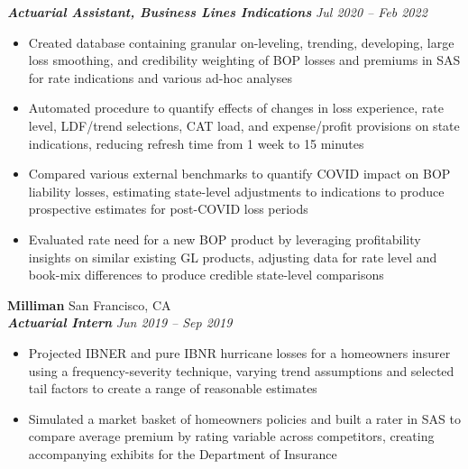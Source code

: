 \documentclass[11pt,letterpaper]{article}
\newcommand{\smallspace}{\vspace{6pt}}
\begin{document}
\textbf{\textit{Actuarial Assistant, Business Lines Indications}} \hfill \textit{Jul 2020 -- Feb 2022}
\begin{itemize}
	\item Created database containing granular on-leveling, trending, developing, large loss smoothing, and credibility weighting of BOP losses and premiums in SAS for rate indications and various ad-hoc analyses
	\item Automated procedure to quantify effects of changes in loss experience, rate level, LDF/trend selections, CAT load, and expense/profit provisions on state indications, reducing refresh time from 1 week to 15 minutes
	\item Compared various external benchmarks to quantify COVID impact on BOP liability losses, estimating state-level adjustments to indications to produce prospective estimates for post-COVID loss periods
	\item Evaluated rate need for a new BOP product by leveraging profitability insights on similar existing GL products, adjusting data for rate level and book-mix differences to produce credible state-level comparisons
\end{itemize}
\smallspace
\textbf{Milliman} \hfill San Francisco, CA \\
\textbf{\textit{Actuarial Intern}} \hfill \textit{Jun 2019 -- Sep 2019}
\begin{itemize}
	\item Projected IBNER and pure IBNR hurricane losses for a homeowners insurer using a frequency-severity technique, varying trend assumptions and selected tail factors to create a range of reasonable estimates
	\item Simulated a market basket of homeowners policies and built a rater in SAS to compare average premium by rating variable across competitors, creating accompanying exhibits for the Department of Insurance
\end{itemize}
\end{document}
